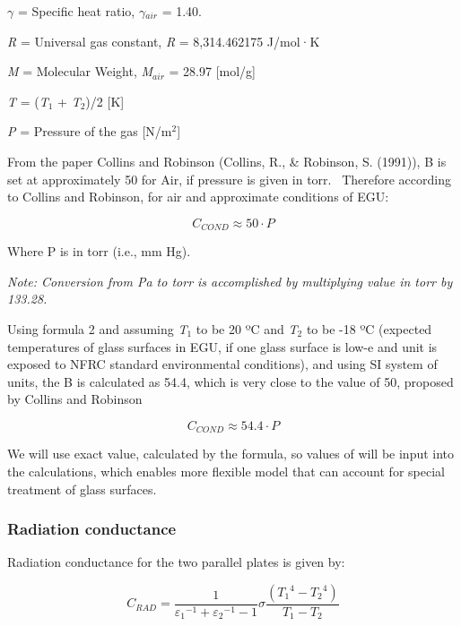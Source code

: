 $\gamma$ = Specific heat ratio, $\gamma$\(_{air}\) = 1.40.

\emph{R} = Universal gas constant, \emph{R} = 8,314.462175 J/mol·K

\emph{M} = Molecular Weight, \emph{M}\(_{air}\) = 28.97 {[}mol/g{]}

\emph{T} = (\emph{T}\(_{1}\) + \emph{T}\(_{2}\))/2 {[}K{]}

\emph{P} = Pressure of the gas {[}N/m\(^{2}\){]}

From the paper Collins and Robinson (Collins, R., \& Robinson, S. (1991)), B is set at approximately 50 for Air, if pressure is given in torr.~ Therefore according to Collins and Robinson, for air and approximate conditions of EGU:

\begin{equation}
  C_{COND} \approx 50 \cdot P
\end{equation}

Where P is in torr (i.e., mm Hg).

\emph{Note: Conversion from Pa to torr is accomplished by multiplying value in torr by 133.28.}

Using formula 2 and assuming \emph{T}\(_{1}\) to be 20 ºC and \emph{T}\(_{2}\) to be -18 ºC (expected temperatures of glass surfaces in EGU, if one glass surface is low-e and unit is exposed to NFRC standard environmental conditions), and using SI system of units, the B is calculated as 54.4, which is very close to the value of 50, proposed by Collins and Robinson

\begin{equation}
  C_{COND} \approx 54.4 \cdot P
\end{equation}

We will use exact value, calculated by the formula, so values of will be input into the calculations, which enables more flexible model that can account for special treatment of glass surfaces.

\subsubsection{Radiation conductance}\label{radiation-conductance}

Radiation conductance for the two parallel plates is given by:

\begin{equation}
{C_{RAD}} = \frac{1}{{{\varepsilon_1}^{ - 1} + {\varepsilon_2}^{ - 1} - 1}}\sigma \frac{{\left( {{T_1}^4 - {T_2}^4} \right)}}{{{T_1} - {T_2}}}
\end{equation}

